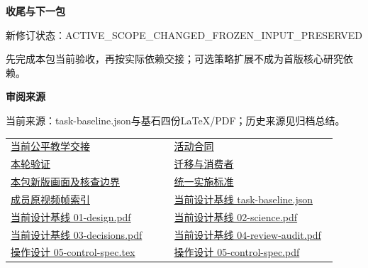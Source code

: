 \documentclass[11pt,a4paper]{article}
\newcommand{\reviewsubsection}[1]{\par\Needspace{4\baselineskip}\vspace{4pt}\begin{center}{\titlelatin\titlecjk\bfseries\fontsize{12}{18}\selectfont #1}\end{center}}
\begin{document}
\reviewsubsection{3.3 收尾与下一包}
新修订状态：ACTIVE\_\allowbreak{}SCOPE\_\allowbreak{}CHANGED\_\allowbreak{}FROZEN\_\allowbreak{}INPUT\_\allowbreak{}PRESERVED


先完成本包当前验收，再按实际依赖交接；可选策略扩展不成为首版核心研究依赖。


\begin{minipage}{\linewidth}
\reviewsubsection{3.4 审阅来源}
当前来源：task-\allowbreak{}baseline.json与基石四份LaTeX/\allowbreak{}PDF；历史来源见归档总结。


\begingroup\small\setlength{\tabcolsep}{4pt}\begin{tabular}{@{}p{0.48\linewidth}p{0.48\linewidth}@{}}
\href{file:///D:/Agent/srp/agent/tasks/U12-03/outputs/current-training.md}{当前公平教学交接} & \href{file:///D:/Agent/srp/agent/tasks/U12-03/outputs/contract.json}{活动合同}\\[4pt]
\href{file:///D:/Agent/srp/agent/tasks/U12-03/evidence/verification.json}{本轮验证} & \href{file:///D:/Agent/srp/agent/tasks/U12-03/evidence/consumer-impact.md}{迁移与消费者}\\[4pt]
\href{file:///D:/Agent/srp/agent/tasks/U12-03/outputs/current-implementation-evidence.md}{本包新版画面及核查边界} & \href{file:///D:/Agent/srp/agent/design/weather/2026-10-08_Storm\%E4\%B8\%8E\%E7\%BA\%AF\%E7\%B2\%92\%E5\%AD\%90\%E5\%8F\%8C\%E7\%8E\%AF\%E5\%AE\%9E\%E6\%96\%BD\%E6\%A0\%87\%E5\%87\%86.md}{统一实施标准}\\[4pt]
\href{file:///D:/Agent/srp/human/assets/previews/2026-10-08/member-storm-particle-rings/frame-index.json}{成员原视频帧索引} & \href{file:///D:/Agent/srp/agent/design/design-foundation-20261008/task-baseline.json}{当前设计基线 task-\allowbreak{}baseline.json}\\[4pt]
\href{file:///D:/Agent/srp/agent/design/design-foundation-20261008/01-design.pdf}{当前设计基线 01-\allowbreak{}design.pdf} & \href{file:///D:/Agent/srp/agent/design/design-foundation-20261008/02-science.pdf}{当前设计基线 02-\allowbreak{}science.pdf}\\[4pt]
\href{file:///D:/Agent/srp/agent/design/design-foundation-20261008/03-decisions.pdf}{当前设计基线 03-\allowbreak{}decisions.pdf} & \href{file:///D:/Agent/srp/agent/design/design-foundation-20261008/04-review-audit.pdf}{当前设计基线 04-\allowbreak{}review-\allowbreak{}audit.pdf}\\[4pt]
\href{file:///D:/Agent/srp/agent/design/design-foundation-20261008/05-control-spec.tex}{操作设计 05-\allowbreak{}control-\allowbreak{}spec.tex} & \href{file:///D:/Agent/srp/agent/design/design-foundation-20261008/05-control-spec.pdf}{操作设计 05-\allowbreak{}control-\allowbreak{}spec.pdf}\\[4pt]

\end{tabular}
\end{minipage}
\end{document}
